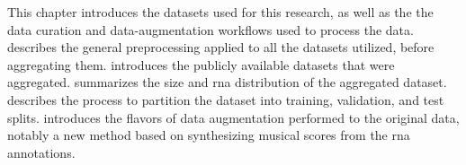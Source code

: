 
This chapter introduces the datasets used for this research,
as well as the the data curation and data-augmentation
workflows used to process the data.
 describes the general
preprocessing applied to all the datasets utilized, before
aggregating them. 
introduces the publicly available datasets that were
aggregated.  summarizes the
size and \gls{rna} distribution of the aggregated dataset.
describes the process to partition the dataset into
training, validation, and test splits.
 introduces the flavors of data
augmentation performed to the original data, notably a new
method based on synthesizing musical scores from the
\gls{rna} annotations.
